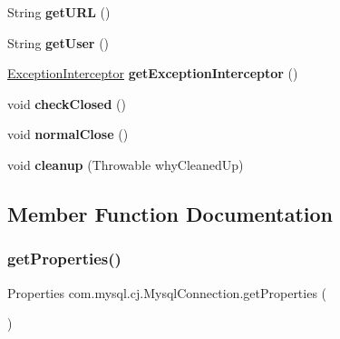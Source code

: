 \begin{DoxyCompactItemize}
\item 
\mbox{\label{interfacecom_1_1mysql_1_1cj_1_1_mysql_connection_a8fab6ed57d7f54fbd017890355b610a2}} 
String {\bfseries get\+U\+RL} ()
\item 
\mbox{\label{interfacecom_1_1mysql_1_1cj_1_1_mysql_connection_adc3ee83d060d0d48cb92e181dc5cbbb6}} 
String {\bfseries get\+User} ()
\item 
\mbox{\label{interfacecom_1_1mysql_1_1cj_1_1_mysql_connection_a90d92a3170923d8e05d748f2079dca15}} 
\mbox{\hyperlink{interfacecom_1_1mysql_1_1cj_1_1exceptions_1_1_exception_interceptor}{Exception\+Interceptor}} {\bfseries get\+Exception\+Interceptor} ()
\item 
\mbox{\label{interfacecom_1_1mysql_1_1cj_1_1_mysql_connection_a49756db5417b86971e0f2bb17ae71630}} 
void {\bfseries check\+Closed} ()
\item 
\mbox{\label{interfacecom_1_1mysql_1_1cj_1_1_mysql_connection_a15e693e5e3b333c7a29b238b510734ab}} 
void {\bfseries normal\+Close} ()
\item 
\mbox{\label{interfacecom_1_1mysql_1_1cj_1_1_mysql_connection_a20ea00c4098425d1caa0ab9fbf28338c}} 
void {\bfseries cleanup} (Throwable why\+Cleaned\+Up)
\end{DoxyCompactItemize}


\subsection{Member Function Documentation}
\mbox{\label{interfacecom_1_1mysql_1_1cj_1_1_mysql_connection_a1fde8714cc1e2176748fd4f35f0df0d1}} 
\subsubsection{\texorpdfstring{get\+Properties()}{getProperties()}}
{\footnotesize\ttfamily Properties com.\+mysql.\+cj.\+Mysql\+Connection.\+get\+Properties (\begin{DoxyParamCaption}{ }\end{DoxyParamCaption})}

